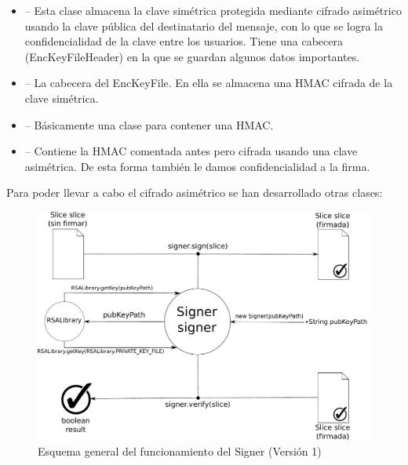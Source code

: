 \begin{itemize}
  \item {} -- Esta clase almacena la clave simétrica protegida
  mediante cifrado asimétrico usando la clave pública del destinatario del
  mensaje, con lo que se logra la confidencialidad de la clave entre los
  usuarios. Tiene una cabecera (EncKeyFileHeader) en la que se guardan algunos
  datos importantes.

  \item {} -- La cabecera del EncKeyFile. En ella se
  almacena una HMAC cifrada de la clave simétrica.

  \item {} -- Básicamente una clase para contener una HMAC.

  \item {} -- Contiene la HMAC comentada antes pero
  cifrada usando una clave asimétrica. De esta forma también le damos
  confidencialidad a la firma.
\end{itemize}

Para poder llevar a cabo el cifrado asimétrico se han desarrollado otras clases:

\begin{figure}[!htb]
  \centering
  \includegraphics[scale=0.5]{Figures/Signer_1}
  \decoRule
  \caption[Signer (Versión 1)]{Esquema general del funcionamiento del Signer (Versión 1)}
  \label{fig:Signer_1}
\end{figure}

